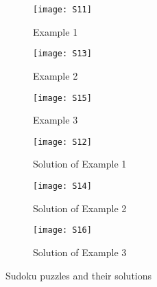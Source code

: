 \documentclass[conference]{IEEEtran}
\begin{document}
\begin{figure}[H]
    \centering
    \setlength{\abovecaptionskip}{4pt} 
    \setlength{\belowcaptionskip}{4pt}
    
    \begin{multicols}{2} 
    
    \begin{subfigure}{\linewidth}
        \centering
        \texttt{[image: S11]} 
        \caption{Example 1}
        \label{fig:s11}
    \end{subfigure}
    
    \begin{subfigure}{\linewidth}
        \centering
        \texttt{[image: S13]} 
        \caption{Example 2}
        \label{fig:s13}
    \end{subfigure}
    
    \begin{subfigure}{\linewidth}
        \centering
        \texttt{[image: S15]} 
        \caption{Example 3}
        \label{fig:s15}
    \end{subfigure}
    
    \columnbreak 
    
    \begin{subfigure}{\linewidth}
        \centering
        \texttt{[image: S12]} 
        \caption{Solution of Example 1}
        \label{fig:s12}
    \end{subfigure}
    
    \begin{subfigure}{\linewidth}
        \centering
        \texttt{[image: S14]} 
        \caption{Solution of Example 2}
        \label{fig:s14}
    \end{subfigure}
    
    \begin{subfigure}{\linewidth}
        \centering
        \texttt{[image: S16]} 
        \caption{Solution of Example 3}
        \label{fig:s16}
    \end{subfigure}
    
    \end{multicols}
    
    \caption{Sudoku puzzles and their solutions}
\end{figure}
\end{document}
